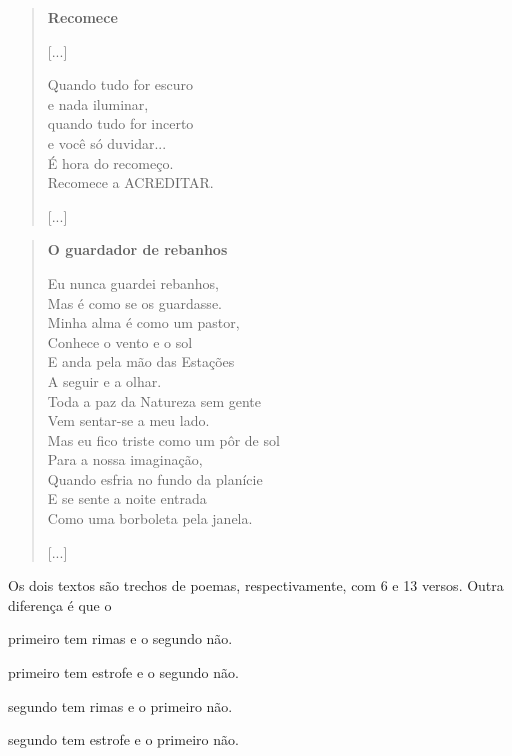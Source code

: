 \begin{myquote}
\begin{verse}
\textbf{Recomece}

{[}...{]}

Quando tudo for escuro\\
e nada iluminar,\\
quando tudo for incerto\\
e você só duvidar...\\
É hora do recomeço.\\
Recomece a ACREDITAR.

{[}...{]}

\end{verse}

\begin{verse}
\textbf{O guardador de rebanhos}

Eu nunca guardei rebanhos,\\
Mas é como se os guardasse.\\
Minha alma é como um pastor,\\
Conhece o vento e o sol\\
E anda pela mão das Estações\\
A seguir e a olhar.\\
Toda a paz da Natureza sem gente\\
Vem sentar-se a meu lado.\\
Mas eu fico triste como um pôr de sol\\
Para a nossa imaginação,\\
Quando esfria no fundo da planície\\
E se sente a noite entrada\\
Como uma borboleta pela janela.

{[}...{]}

\end{verse}
\end{myquote}

Os dois textos são trechos de poemas, respectivamente, com 6 e 13
versos. Outra diferença é que o

\begin{escolha}
\item primeiro tem rimas e o segundo não.

\item primeiro tem estrofe e o segundo não.

\item segundo tem rimas e o primeiro não.

\item segundo tem estrofe e o primeiro não.
\end{escolha}


